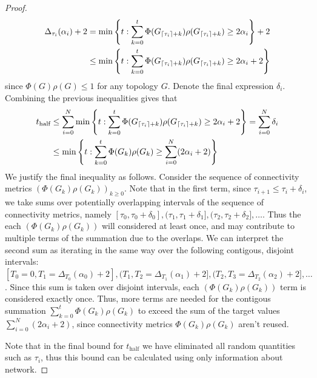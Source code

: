 \begin{proof}
\begin{align*}
		\Delta_{\tau_i}(\alpha_i) + 2 
		&=
		\min \left\{t: \sum_{k=0}^t \Phi(G_{\lceil\tau_i\rceil+k})\rho(G_{\lceil\tau_i\rceil+k}) \geq 2 \alpha_i \right\} + 2 \\
		&\leq \min \left\{t: \sum_{k=0}^t \Phi(G_{\lceil\tau_i\rceil+k})\rho(G_{\lceil\tau_i\rceil+k}) \geq 2 \alpha_i + 2 \right\}
	\end{align*}
	since $\Phi(G)\rho(G) \leq 1$ for  any topology $G$. Denote the final expression $\delta_i$. Combining the previous inequalities gives that
	\begin{align*}
		t_\text{half} &\leq \sum_{i=0}^N \min \left\{t: \sum_{k=0}^t \Phi(G_{\lceil\tau_i\rceil+k})\rho(G_{\lceil\tau_i\rceil+k}) \geq 2 \alpha_i + 2 \right\} = \sum_{i=0}^N \delta_i \\
		&\leq \min \left\{t: \sum_{k=0}^t \Phi(G_k)\rho(G_k) \geq \sum_{i=0}^N (2 \alpha_i + 2) \right\}
	\end{align*}
	We justify the final inequality as follows. Consider the sequence of connectivity metrics $(\Phi(G_k)\rho(G_k))_{k \geq 0}$.
	Note that in the first term, since $\tau_{i+1} \leq \tau_i + \delta_i$, we take sums over potentially overlapping intervals of the sequence of connectivity metrics, namely $[\tau_0, \tau_0 + \delta_0], (\tau_1, \tau_1 + \delta_1], (\tau_2, \tau_2 + \delta_2], \dots$. Thus the each $(\Phi(G_k)\rho(G_k))$ will considered at least once, and may contribute to multiple terms of the summation due to the overlaps. We can interpret the second sum as iterating in the same way over the following contigous, disjoint intervals: $[T_0 = 0, T_1 = \Delta_{T_0}(\alpha_0) + 2], (T_1, T_2 = \Delta_{T_1}(\alpha_1) + 2], (T_2, T_3 = \Delta_{T_2}(\alpha_2) + 2], \dots$. Since this sum is taken over disjoint intervals, each $(\Phi(G_k)\rho(G_k))$ term is considered exactly once. Thus, more terms are needed for the contigous summation $\sum_{k=0}^t \Phi(G_k)\rho(G_k)$ to exceed the sum of the target values $\sum_{i=0}^N (2 \alpha_i + 2)$, since connectivity metrics $\Phi(G_k)\rho(G_k)$ aren't reused.%

	Note that in the final bound for $t_\text{half}$ we have eliminated all random quantities such as $\tau_i$, thus this bound can be calculated using only information about network.




\end{proof}
